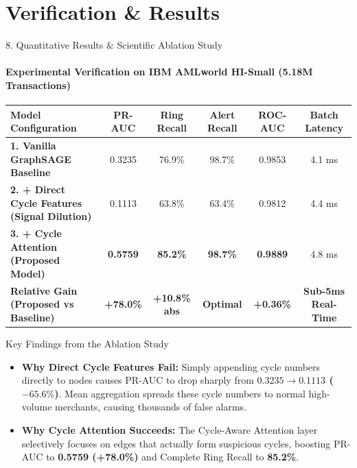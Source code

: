 \documentclass[aspectratio=169, 11pt]{beamer}
\begin{document}
\section{Verification \& Results}

\begin{frame}{8. Quantitative Results \& Scientific Ablation Study}
    \framesubtitle{Experimental Verification on IBM AMLworld HI-Small (5.18M Transactions)}
    \begin{table}
        \centering
        \scriptsize
        \renewcommand{\arraystretch}{1.18}
        \begin{tabularx}{\textwidth}{p{4.2cm} c c c c c}
            \toprule
            \textbf{Model Configuration} & \textbf{PR-AUC} & \textbf{Ring Recall} & \textbf{Alert Recall} & \textbf{ROC-AUC} & \textbf{Batch Latency} \\
            \midrule
            \textbf{1. Vanilla GraphSAGE Baseline} & 0.3235 & 76.9\% & 98.7\% & 0.9853 & 4.1 ms \\
            \textbf{2. + Direct Cycle Features (Signal Dilution)} & 0.1113 & 63.8\% & 63.4\% & 0.9812 & 4.4 ms \\
            \textbf{3. + Cycle Attention (Proposed Model)} & \textbf{0.5759} & \textbf{85.2\%} & \textbf{98.7\%} & \textbf{0.9889} & 4.8 ms \\
            \midrule
            \textbf{Relative Gain (Proposed vs Baseline)} & \textbf{+78.0\%} & \textbf{+10.8\% abs} & \textbf{Optimal} & \textbf{+0.36\%} & \textbf{Sub-5ms Real-Time} \\
            \bottomrule
        \end{tabularx}
    \end{table}

    \begin{block}{Key Findings from the Ablation Study}
        \footnotesize
        \begin{itemize}\setlength{\itemsep}{2pt}
            \item \textbf{Why Direct Cycle Features Fail:} Simply appending cycle numbers directly to nodes causes PR-AUC to drop sharply from \textbf{$0.3235 \to 0.1113$ ($-65.6\%$)}. Mean aggregation spreads these cycle numbers to normal high-volume merchants, causing thousands of false alarms.
            \item \textbf{Why Cycle Attention Succeeds:} The Cycle-Aware Attention layer selectively focuses on edges that actually form suspicious cycles, boosting PR-AUC to \textbf{0.5759 (+78.0\%)} and Complete Ring Recall to \textbf{85.2\%}.
        \end{itemize}
    \end{block}
\end{frame}
\end{document}
